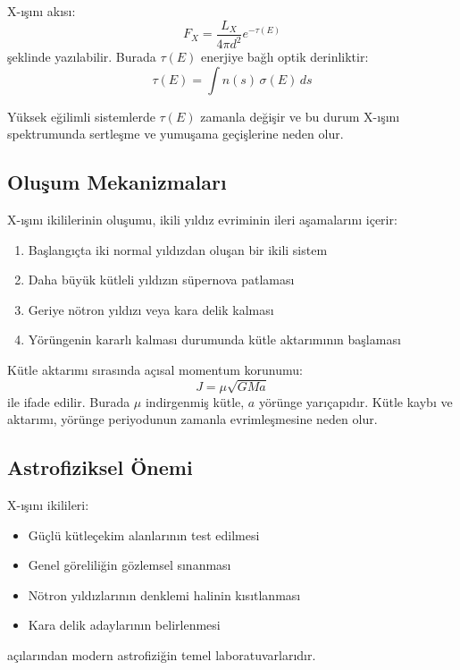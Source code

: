 X-ışını akısı:
\begin{equation}
F_X = \frac{L_X}{4\pi d^2} e^{-\tau(E)}
\end{equation}
şeklinde yazılabilir. Burada $\tau(E)$ enerjiye bağlı optik derinliktir:
\begin{equation}
\tau(E) = \int n(s)\,\sigma(E)\,ds
\end{equation}

Yüksek eğilimli sistemlerde $\tau(E)$ zamanla değişir ve bu durum X-ışını spektrumunda sertleşme ve yumuşama geçişlerine neden olur.

\subsection{Oluşum Mekanizmaları}

X-ışını ikililerinin oluşumu, ikili yıldız evriminin ileri aşamalarını içerir:
\begin{enumerate}
    \item Başlangıçta iki normal yıldızdan oluşan bir ikili sistem
    \item Daha büyük kütleli yıldızın süpernova patlaması
    \item Geriye nötron yıldızı veya kara delik kalması
    \item Yörüngenin kararlı kalması durumunda kütle aktarımının başlaması
\end{enumerate}

Kütle aktarımı sırasında açısal momentum korunumu:
\begin{equation}
J = \mu \sqrt{GMa}
\end{equation}
ile ifade edilir. Burada $\mu$ indirgenmiş kütle, $a$ yörünge yarıçapıdır. Kütle kaybı ve aktarımı, yörünge periyodunun zamanla evrimleşmesine neden olur.

\subsection{Astrofiziksel Önemi}

X-ışını ikilileri:
\begin{itemize}
    \item Güçlü kütleçekim alanlarının test edilmesi
    \item Genel göreliliğin gözlemsel sınanması
    \item Nötron yıldızlarının denklemi halinin kısıtlanması
    \item Kara delik adaylarının belirlenmesi
\end{itemize}
açılarından modern astrofiziğin temel laboratuvarlarıdır.


